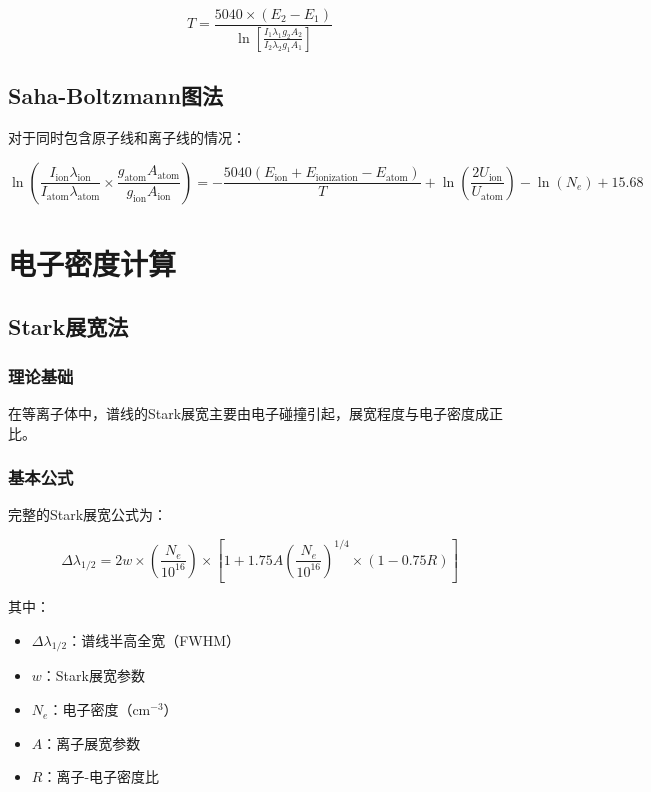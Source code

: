 \documentclass[12pt,a4paper]{article}
\begin{document}
\begin{equation}
\boxed{T = \frac{5040 \times (E_2 - E_1)}{\ln\left[\frac{I_1\lambda_1g_2A_2}{I_2\lambda_2g_1A_1}\right]}}
\end{equation}

\subsection{Saha-Boltzmann图法}

对于同时包含原子线和离子线的情况：

\begin{equation}
\ln\left(\frac{I_{\text{ion}}\lambda_{\text{ion}}}{I_{\text{atom}}\lambda_{\text{atom}}} \times \frac{g_{\text{atom}}A_{\text{atom}}}{g_{\text{ion}}A_{\text{ion}}}\right) = -\frac{5040(E_{\text{ion}} + E_{\text{ionization}} - E_{\text{atom}})}{T} + \ln\left(\frac{2U_{\text{ion}}}{U_{\text{atom}}}\right) - \ln(N_e) + 15.68
\end{equation}

\section{电子密度计算}

\subsection{Stark展宽法}

\subsubsection{理论基础}

在等离子体中，谱线的Stark展宽主要由电子碰撞引起，展宽程度与电子密度成正比。

\subsubsection{基本公式}

完整的Stark展宽公式为：

\begin{equation}
\Delta\lambda_{1/2} = 2w \times \left(\frac{N_e}{10^{16}}\right) \times \left[1 + 1.75A\left(\frac{N_e}{10^{16}}\right)^{1/4} \times (1-0.75R)\right]
\end{equation}

其中：
\begin{itemize}
    \item $\Delta\lambda_{1/2}$：谱线半高全宽（FWHM）
    \item $w$：Stark展宽参数
    \item $N_e$：电子密度（cm$^{-3}$）
    \item $A$：离子展宽参数
    \item $R$：离子-电子密度比
\end{itemize}
\end{document}
